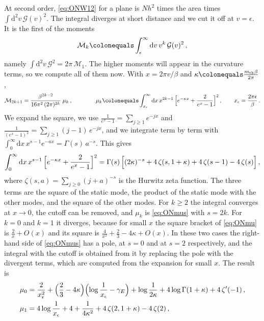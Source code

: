 \documentclass[a4paper,11pt]{article}
\newcommand{\dd}{\mathrm{d}}
\begin{document}
At second order, \eqref{eq:ONW12} for a plane is $N h^2$ times the area times $\int\dd^2v\,\mathcal{G}(v)^2$. The integral diverges at short distance and we cut it off at $v=\epsilon$. It is the first of the moments
\begin{equation}\label{eq:ONMk}
	\mathcal{M}_k\colonequals\int_\epsilon^\infty\dd v\,v^k\,\mathcal{G}(v)^2\, ,
\end{equation}
namely $\int\dd^2v\,\mathcal{G}^2=2\pi\,\mathcal{M}_1$. The higher moments will appear in the curvature terms, so we compute all of them now. With $x=2\pi v/\beta$ and $\kappa\colonequals\tfrac{m_{\rm th}\beta}{2\pi}$,
\begin{equation}\label{eq:ONmu}
	\mathcal{M}_{2k+1}=\frac{\beta^{2k-2}}{16\pi^2\,(2\pi)^{2k}}\;\mu_k\, ,\qquad\qquad
	\mu_k\colonequals\int_{x_\epsilon}^\infty\dd x\,x^{2k-1}\,\Bigl[e^{-\kappa x}+\frac{2}{e^x-1}\Bigr]^2\, ,\qquad x_\epsilon=\frac{2\pi\epsilon}{\beta}\, .
\end{equation}
We expand the square, we use $\tfrac{1}{e^x-1}=\sum_{j\ge1}e^{-jx}$ and $\tfrac{1}{(e^x-1)^2}=\sum_{j\ge1}(j-1)\,e^{-jx}$, and we integrate term by term with $\int_0^\infty\dd x\,x^{s-1}e^{-ax}=\Gamma(s)\,a^{-s}$. This gives
\begin{equation}\label{eq:ONmus}
	\int_0^\infty\dd x\,x^{s-1}\,\Bigl[e^{-\kappa x}+\frac{2}{e^x-1}\Bigr]^2=\Gamma(s)\,\Bigl[(2\kappa)^{-s}+4\,\zeta(s,1+\kappa)+4\,\zeta(s-1)-4\,\zeta(s)\Bigr]\, ,
\end{equation}
where $\zeta(s,a)=\sum_{j\ge0}(j+a)^{-s}$ is the Hurwitz zeta function. The three terms are the square of the static mode, the product of the static mode with the other modes, and the square of the other modes. For $k\ge2$ the integral converges at $x\to0$, the cutoff can be removed, and $\mu_k$ is \eqref{eq:ONmus} with $s=2k$. For $k=0$ and $k=1$ it diverges, because for small $x$ the square bracket of \eqref{eq:ONmu} is $\tfrac2x+O(x)$ and its square is $\tfrac{4}{x^2}+\tfrac23-4\kappa+O(x)$. In these two cases the right-hand side of \eqref{eq:ONmus} has a pole, at $s=0$ and at $s=2$ respectively, and the integral with the cutoff is obtained from it by replacing the pole with the divergent terms, which are computed from the expansion for small $x$. The result is
\begin{equation}\label{eq:ONmu01}
	\begin{aligned}
		\mu_0&=\frac{2}{x_\epsilon^2}+\Bigl(\frac23-4\kappa\Bigr)\Bigl(\log\frac{1}{x_\epsilon}-\gamma_E\Bigr)+\log\frac{1}{2\kappa}+4\log\Gamma(1+\kappa)+4\,\zeta'(-1)\, ,\\
		\mu_1&=4\log\frac{1}{x_\epsilon}+4+\frac{1}{4\kappa^2}+4\,\zeta(2,1+\kappa)-4\,\zeta(2)\, ,
	\end{aligned}
\end{equation}
\end{document}
